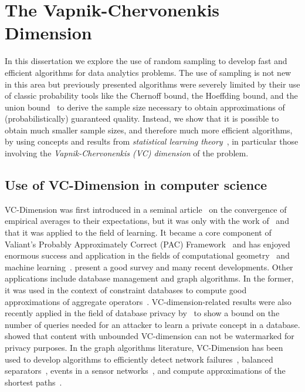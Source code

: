 \chapter{The Vapnik-Chervonenkis Dimension}\label{ch:vcdim}
In this dissertation we explore the use of random sampling to develop fast and
efficient algorithms for data analytics problems. The use of sampling is not new
in this area but previously presented algorithms were severely limited by their
use of classic probability tools like the Chernoff bound, the Hoeffding bound,
and the union bound~\citep{MitzenmacherU05} to derive the sample size
necessary to obtain approximations of (probabilistically) guaranteed quality.
Instead, we show that it is possible to obtain much smaller sample sizes, and
therefore much more efficient algorithms, by using concepts and results from
\emph{statistical learning theory}~\citep{Vapnik99,Vapnik98}, in particular
those involving the \emph{Vapnik-Chervonenkis (VC) dimension} of the problem.

\section{Use of VC-Dimension in computer science}\label{sec:vcliterature}
VC-Dimension was first introduced in a seminal article~\citep{VapnikC71} on
the convergence of empirical averages to their expectations, but it was only with the work
of~\citet{HausslerW86} and~\citet{BlumerEHW89} that it was applied to the field
of learning. It became a core component of Valiant's Probably Approximately
Correct (PAC) Framework~\citep{KearnsV94} and has enjoyed enormous success and
application in the fields of computational
geometry~\citep{Chazelle00,Matousek02} and machine
learning~\citep{AnthonyB99,DevroyeGL96}. \citet{BoucheronBL05} present a good
survey and many recent developments. Other applications include database
management and graph algorithms. In the former, it was used in the context of
constraint databases to compute good approximations of aggregate
operators~\citep{BenediktL02}. VC-dimension-related results were also recently
applied in the field of database privacy by~\citet{BlumLR08} to show a bound on
the number of queries needed for an attacker to learn a private concept in a
database. \citet{Gross11} showed that content with unbounded VC-dimension can
not be watermarked for privacy purposes. In the graph algorithms literature,
VC-Dimension has been used to develop algorithms to efficiently detect network
failures~\citep{Kleinberg03,KleinbergSS08}, balanced
separators~\citep{FeigeM06}, events in a sensor networks~\citep{GandhiSW10}, and
compute approximations of the shortest paths~\citep{AbrahamDFGW11}.

